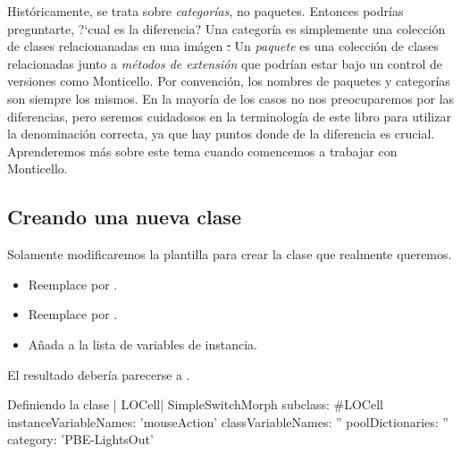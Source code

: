 \documentclass[a4paper,10pt,twoside]{book}
\begin{document}
Hist\'oricamente, se trata sobre \emph{categor\'ias}, no paquetes.
Entonces podr\'ias preguntarte, ?`cual es la diferencia?
Una categor\'ia es simplemente una colecci\'on de clases relacionanadas en
una im\'agen \st.
Un \emph{paquete} es una colecci\'on de clases relacionadas junto a
\emph{m\'etodos de extensi\'on} que podr\'ian estar bajo un control de versiones
como Monticello.
Por convenci\'on, los nombres de paquetes y categor\'ias son siempre los mismos.
En la mayor\'ia de los casos no nos preocuparemos por las diferencias, pero
seremos cuidadosos en la terminolog\'ia de este libro para utilizar la
denominaci\'on correcta, ya que hay puntos donde de la diferencia es crucial.
Aprenderemos m\'as sobre este tema cuando comencemos a trabajar con Monticello.


\subsection{Creando una nueva clase}

Solamente modificaremos la plantilla para crear la clase que realmente queremos.

\begin{itemize}
  \item Reemplace  por .
  \item Reemplace  por .
  \item A\~nada  a la lista de variables de instancia.
\end{itemize}
El resultado deber\'ia parecerse a .

\begin{classdef}[firstClassDef]{Definiendo la clase \ct| LOCell|}
SimpleSwitchMorph subclass: #LOCell
   instanceVariableNames: 'mouseAction'
   classVariableNames: ''
   poolDictionaries: ''
   category: 'PBE-LightsOut'
\end{classdef}

\end{document}
